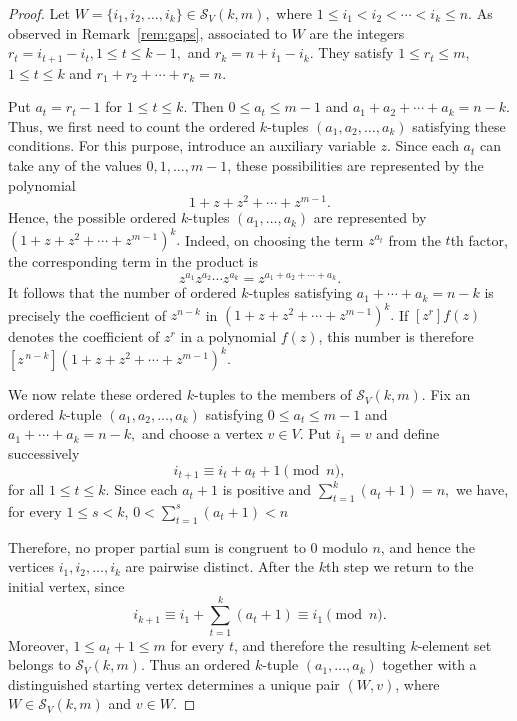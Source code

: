 \documentclass[12pt,reqno]{amsart}
\theoremstyle{definition}
\numberwithin{equation}{section}
\begin{document}
\begin{proof}
	Let \(W=\{i_1,i_2,\ldots,i_k\}\in\mathcal{S}_V(k,m),\) where \(1\leq i_1<i_2<\cdots<i_k\leq n.\)
	As observed in Remark~\ref{rem:gaps}, associated to $W$ are the integers \( r_t=i_{t+1}-i_t, 1\leq t\leq k-1, \) and \( r_k=n+i_1-i_k. \)
	They satisfy \(1\leq r_t\leq m\), \( 1\leq t\leq k \) and \( r_1+r_2+\cdots+r_k=n. \)
	
	Put \( a_t=r_t-1 \) for \( 1\leq t\leq k \). Then
	\( 0\leq a_t\leq m-1 \)
	and \( a_1+a_2+\cdots+a_k=n-k. \)
	Thus, we first need to count the ordered $k$-tuples
	$(a_1,a_2,\ldots,a_k)$ satisfying these conditions. For this purpose, introduce an auxiliary variable $z$. Since each $a_t$
	can take any of the values $0,1,\ldots,m-1$, these possibilities are
	represented by the polynomial
	\[
	1+z+z^2+\cdots+z^{m-1}.
	\]
	Hence, the possible ordered $k$-tuples
	$(a_1,\ldots,a_k)$ are represented by
	\( (1+z+z^2+\cdots+z^{m-1})^k. \)
	Indeed, on choosing the term $z^{a_t}$ from the $t$th factor, the
	corresponding term in the product is
	\[
	z^{a_1}z^{a_2}\cdots z^{a_k}
	=
	z^{a_1+a_2+\cdots+a_k}.
	\]
	It follows that the number of ordered $k$-tuples satisfying \( a_1+\cdots+a_k=n-k \)
	is precisely the coefficient of $z^{n-k}$ in \( (1+z+z^2+\cdots+z^{m-1})^k. \)
	If $[z^r]f(z)$ denotes the coefficient of $z^r$ in a polynomial $f(z)$, this number is therefore \( [z^{\,n-k}](1+z+z^2+\cdots+z^{m-1})^k. \)
	
	We now relate these ordered $k$-tuples to the members of
	$\mathcal{S}_V(k,m)$. Fix an ordered $k$-tuple
	\( (a_1,a_2,\ldots,a_k) \) satisfying \( 0\leq a_t\leq m-1\) and \(a_1+\cdots+a_k=n-k, \)
	and choose a vertex $v\in V$. Put $i_1=v$ and define successively
	\[
	i_{t+1}\equiv i_t+a_t+1\pmod n,
	\]
	for all \( 1\leq t\leq k. \) Since each $a_t+1$ is positive and \( \sum_{t=1}^{k}(a_t+1)=n, \)
	we have, for every $1\leq s<k$,
\( 	0<
\sum_{t=1}^{s}(a_t+1)
<n\)

	Therefore, no proper partial sum is congruent to $0$ modulo $n$, and
	hence the vertices \( i_1,i_2,\ldots,i_k \)
	are pairwise distinct. After the $k$th step we return to the initial
	vertex, since
	\[
	i_{k+1}
	\equiv
	i_1+\sum_{t=1}^{k}(a_t+1)
	\equiv i_1\pmod n.
	\]
	Moreover, \( 1\leq a_t+1\leq m \) for every $t$, and therefore the resulting $k$-element set belongs to
	$\mathcal{S}_V(k,m)$. Thus an ordered $k$-tuple $(a_1,\ldots,a_k)$ together with a distinguished
	starting vertex determines a unique pair $(W,v)$, where \( W\in\mathcal{S}_V(k,m) \) and \( v\in W \).
	

\end{proof}
\end{document}
